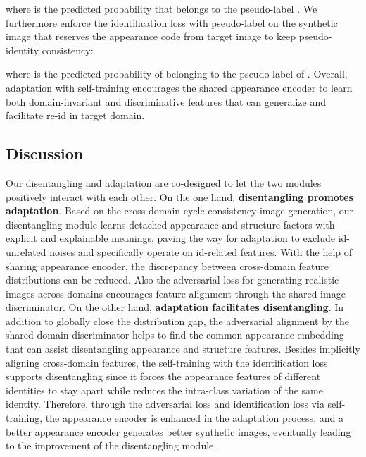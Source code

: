 \documentclass[runningheads]{llncs}
\begin{document}
\noindent where  is the predicted probability that  belongs to the pseudo-label . We furthermore enforce the identification loss with pseudo-label on the synthetic image that reserves the appearance code from target image to keep pseudo-identity consistency:

\noindent where  is the predicted probability of  belonging to the pseudo-label  of . Overall, adaptation with self-training encourages the shared appearance encoder to learn both domain-invariant and discriminative features that can generalize and facilitate re-id in target domain. 









\subsection{Discussion}
Our disentangling and adaptation are co-designed to let the two modules positively interact with each other. On the one hand, \textbf{disentangling promotes adaptation}. Based on the cross-domain cycle-consistency image generation, our disentangling module learns detached appearance and structure factors with explicit and explainable meanings, paving the way for adaptation to exclude id-unrelated noises and specifically operate on id-related features. With the help of sharing appearance encoder, the discrepancy between cross-domain feature distributions can be reduced. Also the adversarial loss for generating realistic images across domains encourages feature alignment through the shared image discriminator. On the other hand, \textbf{adaptation facilitates disentangling}. In addition to globally close the distribution gap, the adversarial alignment by the shared domain discriminator helps to find the common appearance embedding that can assist disentangling appearance and structure features. Besides implicitly aligning cross-domain features, the self-training with the identification loss supports disentangling since it forces the appearance features of different identities to stay apart while reduces the intra-class variation of the same identity. 
Therefore, through the adversarial loss and identification loss via self-training, the appearance encoder is enhanced in the adaptation process, and a better appearance encoder generates better synthetic images, eventually leading to the improvement of the disentangling module. 
\end{document}
